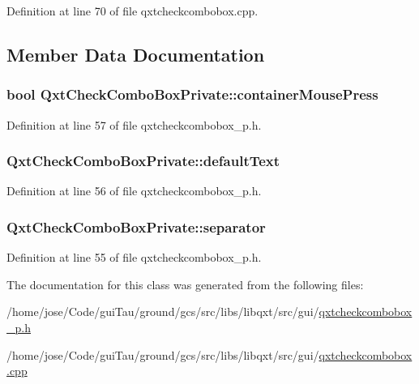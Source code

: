 Definition at line 70 of file qxtcheckcombobox.\-cpp.



\subsection{Member Data Documentation}
\hypertarget{class_qxt_check_combo_box_private_a529e789848e54cc5e6d371155fe14982}{
\subsubsection[{container\-Mouse\-Press}]{\setlength{\rightskip}{0pt plus 5cm}bool Qxt\-Check\-Combo\-Box\-Private\-::container\-Mouse\-Press}}\label{class_qxt_check_combo_box_private_a529e789848e54cc5e6d371155fe14982}


Definition at line 57 of file qxtcheckcombobox\-\_\-p.\-h.

\hypertarget{class_qxt_check_combo_box_private_ae65a2daec59ad610004ae51ed52010de}{
\subsubsection[{default\-Text}]{ Qxt\-Check\-Combo\-Box\-Private\-::default\-Text}}\label{class_qxt_check_combo_box_private_ae65a2daec59ad610004ae51ed52010de}


Definition at line 56 of file qxtcheckcombobox\-\_\-p.\-h.

\hypertarget{class_qxt_check_combo_box_private_aebf792badbbeb707a3ba98c1cc45f124}{
\subsubsection[{separator}]{ Qxt\-Check\-Combo\-Box\-Private\-::separator}}\label{class_qxt_check_combo_box_private_aebf792badbbeb707a3ba98c1cc45f124}


Definition at line 55 of file qxtcheckcombobox\-\_\-p.\-h.



The documentation for this class was generated from the following files\-:\begin{DoxyCompactItemize}
\item 
/home/jose/\-Code/gui\-Tau/ground/gcs/src/libs/libqxt/src/gui/\hyperlink{qxtcheckcombobox__p_8h}{qxtcheckcombobox\-\_\-p.\-h}\item 
/home/jose/\-Code/gui\-Tau/ground/gcs/src/libs/libqxt/src/gui/\hyperlink{qxtcheckcombobox_8cpp}{qxtcheckcombobox.\-cpp}\end{DoxyCompactItemize}
